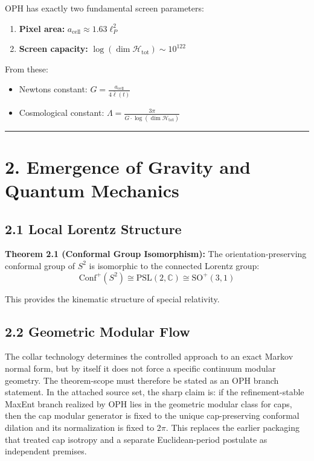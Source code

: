 OPH has exactly two fundamental screen parameters:

\begin{enumerate}
\def\labelenumi{\arabic{enumi}.}
\tightlist
\item
  \textbf{Pixel area:} \(a_{\text{cell}} \approx 1.63 \ell_P^2\)
\item
  \textbf{Screen capacity:} \(\log(\dim \mathcal{H}_{\text{tot}}) \sim 10^{122}\)
\end{enumerate}

From these:

\begin{itemize}
\tightlist
\item
  Newton\textquotesingle s constant: \(G = \frac{a_{\text{cell}}}{4\bar{\ell}(t)}\)
\item
  Cosmological constant: \(\Lambda = \frac{3\pi}{G \cdot \log(\dim \mathcal{H}_{\text{tot}})}\)
\end{itemize}

\begin{center}\rule{0.5\linewidth}{0.5pt}\end{center}

\section{2. Emergence of Gravity and Quantum Mechanics}\label{2-emergence-of-gravity-and-quantum-mechanics}

\subsection{2.1 Local Lorentz Structure}\label{21-local-lorentz-structure}

\textbf{Theorem 2.1 (Conformal Group Isomorphism):} The orientation-preserving conformal group of \(S^2\) is isomorphic to the connected Lorentz group: \[\text{Conf}^+(S^2) \cong \text{PSL}(2,\mathbb{C}) \cong \text{SO}^+(3,1)\]

This provides the kinematic structure of special relativity.

\subsection{2.2 Geometric Modular Flow}\label{22-geometric-modular-flow}

The collar technology determines the controlled approach to an exact Markov normal form, but by itself it does not force a specific continuum modular geometry. The theorem-scope must therefore be stated as an OPH branch statement. In the attached source set, the sharp claim is: if the refinement-stable MaxEnt branch realized by OPH lies in the geometric modular class for caps, then the cap modular generator is fixed to the unique cap-preserving conformal dilation and its normalization is fixed to \(2\pi\). This replaces the earlier packaging that treated cap isotropy and a separate Euclidean-period postulate as independent premises.

